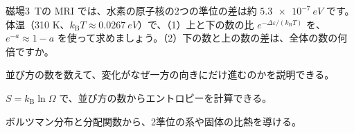 \bkproblem 磁場\qty{3}{T}の MRI では、水素の原子核の2つの準位の差は約 $\qty{5.3e-7}{eV}$ です。体温（310 K、$k_{\mathrm B}T\approx\qty{0.0267}{eV}$）で、（1）上と下の数の比 $e^{-\Delta\varepsilon/(k_{\mathrm B}T)}$ を、$e^{-a}\approx1-a$ を使って求めましょう。（2）下の数と上の数の差は、全体の数の何倍ですか。

\begin{furikaeri}
\begin{checklist}
\item 並び方の数を数えて、変化がなぜ一方の向きにだけ進むのかを説明できる。
\item $S=k_{\mathrm B}\ln\Omega$ で、並び方の数からエントロピーを計算できる。
\item ボルツマン分布と分配関数から、2準位の系や固体の比熱を導ける。
\end{checklist}
\end{furikaeri}
